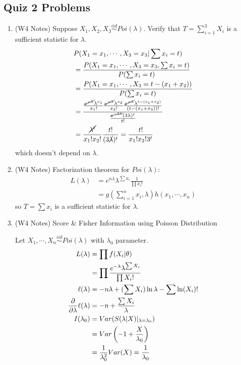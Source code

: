 \documentclass[letterpaper, 8pt]{extarticle}
\begin{document}
\begin{multicols*}{3}
	\section{Quiz 2 Problems}
	\begin{enumerate}[label=\alph*), wide, labelwidth=0pt, labelindent=0pt]
		\item (W4 Notes) Suppose $X_1,X_2,X_3\overset{iid}{\sim}Poi(\lambda)$. Verify that $T=\sum_{i=1}^3X_i$ is a sufficient statistic for $\lambda$.
		\begin{align*}
			&P(X_1=x_1,\cdots,X_3=x_3|\sum x_i=t)\\
			&=\frac{P(X_1=x_1,\cdots,X_3=x_3,\sum x_i=t)}{P(\sum x_i=t)}\\
			&=\frac{P(X_1=x_1,\cdots,X_3=t-(x_1+x_2))}{P(\sum x_i=t)}\\
			&=\frac{\frac{\cancel{e^{-\lambda}}\lambda^{x_1}}{x_1!}\frac{\cancel{e^{-\lambda}}\lambda^{x_2}}{x_2!}\frac{\cancel{e^{-\lambda}}\lambda^{t-(x_1+x_2)}}{(t-(x_1+x_2))!}}{\frac{\cancel{e^{-3\lambda}}(3\lambda)^t}{t!}}\\
			&=\frac{\cancel{\lambda^t}}{x_1!x_2!}\frac{t!}{(3\cancel{\lambda})^t}=\frac{t!}{x_1!x_2!3^t}
		\end{align*}
		which doesn't depend on $\lambda$.
		
		\item (W4 Notes) Factorization theorem for $Poi(\lambda)$:
		\begin{align*}
			L(\lambda)&=e^{n\lambda}\lambda^{\sum x_i}\frac{1}{\prod x_i!}\\
			&=g\left(\sum_{i=1}^nx_i,\lambda\right)h(x_1,\cdots,x_n)
		\end{align*}
		so $T=\sum x_i$ is a sufficient statistic for $\lambda$.
		
		\item (W4 Notes) Score \& Fisher Information using Poisson Distribution
		
		Let $X_1,\cdots,X_n\overset{iid}{\sim}Poi(\lambda)$ with $\lambda_0$ parameter. 
		\begin{align*}
			L(\lambda)&=\prod f(X_i|\theta)\\
			&=\prod\frac{e^{-\lambda}\lambda^{\sum X_i}}{\prod X_i!}\\
			\ell(\lambda)&=-n\lambda +(\sum X_i)\ln\lambda-\sum\ln(X_i)!\\
			\pdv{\lambda}\ell(\lambda)&=-n+\frac{\sum X_i}{\lambda}\\
			I(\lambda_0)&=Var(S(\lambda|X)|_{\lambda=\lambda_0})\\
			&=Var\left(-1+\frac{X}{\lambda_0}\right)\\
			&=\frac{1}{\lambda^2_0}Var(X)=\frac{1}{\lambda_0}
		\end{align*}
    \end{enumerate}
    \newpage

\end{multicols*}
\end{document}
